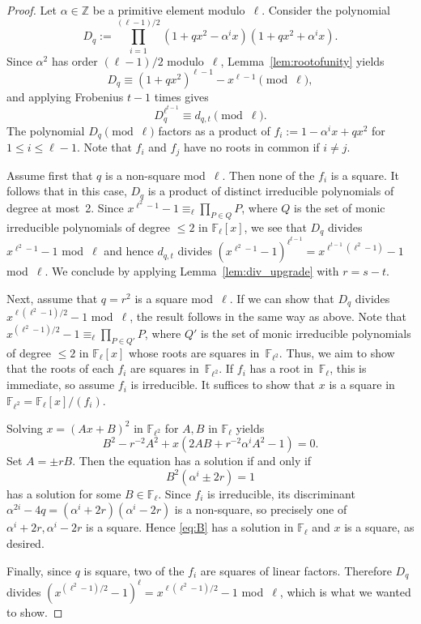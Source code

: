 \documentclass[10pt,a4paper]{amsart}
\newcommand{\bF}{\mathbb{F}}
\begin{document}
\begin{proof}
    Let $\alpha \in \mathbb Z$ be a primitive element modulo~$\ell$. Consider the polynomial
    \[
    D_q := \prod_{i=1}^{(\ell-1)/2} (1 + qx^2 - \alpha^i x)(1 + qx^2 + \alpha^i x).
    \]
    Since $\alpha^2$ has order $(\ell-1)/2$ modulo~$\ell$, Lemma~\ref{lem:rootofunity}  yields
    \[
    D_q \equiv (1 + qx^2)^{\ell-1} - x^{\ell-1} \pmod{\ell},
    \]
    and applying Frobenius $t-1$ times gives
    \[
    D_q^{\ell^{t-1}} \equiv d_{q,t} \pmod{\ell}.
    \]
    The polynomial $D_q \pmod{\ell}$ factors as a product of $f_i := 1 - \alpha^i x + qx^2$ for $1 \leq i \leq \ell-1$. Note that $f_i$ and $f_j$ have no roots in common if $i \neq j$.
    
    Assume first that $q$ is a non-square mod~$\ell$. Then none of the $f_i$ is a square. It follows that in this case, $D_q$ is a product of distinct irreducible polynomials of degree at most~2. Since $x^{\ell^2-1}-1 \equiv_{\ell} \prod_{P \in Q} P$, where $Q$ is the set of monic irreducible polynomials of degree $\leq 2$ in $\mathbb F_{\ell}[x]$, we see that $D_q$ divides $x^{\ell^2-1}-1$ mod~$\ell$ and hence $d_{q,t}$ divides $(x^{\ell^2-1}-1)^{\ell^{t-1}} = x^{\ell^{t-1}(\ell^2-1)}-1$ mod~$\ell$.
    We conclude by applying Lemma~\ref{lem:div_upgrade} with $r=s-t$.
    
    Next, assume that $q = r^2$ is a square mod~$\ell$. If we can show that $D_q$ divides $x^{\ell(\ell^2-1)/2}-1$ mod~$\ell$, the result follows in the same way as above. Note that $x^{(\ell^2-1)/2}-1 \equiv_{\ell} \prod_{P \in Q'} P$, where $Q'$ is the set of monic irreducible polynomials of degree $\leq 2$ in $\bF_{\ell}[x]$ whose roots are squares in~$\bF_{\ell^2}$. Thus, we aim to show that the roots of each $f_i$ are squares in~$\bF_{\ell^2}$. If $f_i$ has a root in~$\bF_{\ell}$, this is immediate, so assume $f_i$ is irreducible. It suffices to show that $x$ is a square in $\bF_{\ell^2} = \bF_{\ell}[x]/(f_i)$.

    Solving $x = (Ax + B)^2$ in $\bF_{\ell^2}$ for $A,B$ in $\bF_{\ell}$ yields
    \[
    B^2 - r^{-2}A^2 + x(2AB+r^{-2}\alpha^i A^2-1) = 0.
    \]
    Set $A = \pm rB$. Then the equation has a solution if and only if
    \begin{equation}\label{eq:B}
    B^2(\alpha^i \pm 2r) = 1
    \end{equation}
    has a solution for some $B \in \bF_{\ell}$. Since $f_i$ is irreducible, its discriminant $\alpha^{2i}-4q = (\alpha^i + 2r)(\alpha^i - 2r)$ is a non-square, so precisely one of $\alpha^i + 2r, \alpha^i - 2r$ is a square. Hence \eqref{eq:B} has a solution in $\bF_{\ell}$ and $x$ is a square, as desired.

    Finally, since $q$ is square, two of the $f_i$ are squares of linear factors. Therefore $D_q$ divides $(x^{(\ell^2-1)/2}-1)^{\ell} = x^{\ell(\ell^2-1)/2}-1$ mod~$\ell$, which is what we wanted to show.
\end{proof}
\end{document}
